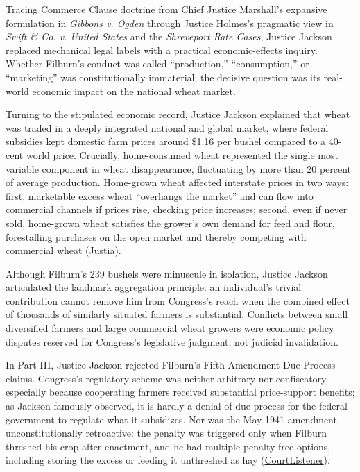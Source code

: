\documentclass[12pt]{article}
\begin{document}
Tracing Commerce Clause doctrine from Chief Justice Marshall's expansive formulation in \textit{Gibbons v. Ogden} through Justice Holmes's pragmatic view in \textit{Swift \& Co. v. United States} and the \textit{Shreveport Rate Cases}, Justice Jackson replaced mechanical legal labels with a practical economic-effects inquiry. Whether Filburn's conduct was called ``production,'' ``consumption,'' or ``marketing'' was constitutionally immaterial; the decisive question was its real-world economic impact on the national wheat market.

Turning to the stipulated economic record, Justice Jackson explained that wheat was traded in a deeply integrated national and global market, where federal subsidies kept domestic farm prices around \$1.16 per bushel compared to a 40-cent world price. Crucially, home-consumed wheat represented the single most variable component in wheat disappearance, fluctuating by more than 20 percent of average production. Home-grown wheat affected interstate prices in two ways: first, marketable excess wheat ``overhangs the market'' and can flow into commercial channels if prices rise, checking price increases; second, even if never sold, home-grown wheat satisfies the grower's own demand for feed and flour, forestalling purchases on the open market and thereby competing with commercial wheat (\href{https://supreme.justia.com/cases/federal/us/317/111/}{Justia}).

Although Filburn's 239 bushels were minuscule in isolation, Justice Jackson articulated the landmark aggregation principle: an individual's trivial contribution cannot remove him from Congress's reach when the combined effect of thousands of similarly situated farmers is substantial. Conflicts between small diversified farmers and large commercial wheat growers were economic policy disputes reserved for Congress's legislative judgment, not judicial invalidation.

In Part III, Justice Jackson rejected Filburn's Fifth Amendment Due Process claims. Congress's regulatory scheme was neither arbitrary nor confiscatory, especially because cooperating farmers received substantial price-support benefits; as Jackson famously observed, it is hardly a denial of due process for the federal government to regulate what it subsidizes. Nor was the May 1941 amendment unconstitutionally retroactive: the penalty was triggered only when Filburn threshed his crop after enactment, and he had multiple penalty-free options, including storing the excess or feeding it unthreshed as hay (\href{https://www.courtlistener.com/opinion/103716/wickard-v-filburn/}{CourtListener}).
\end{document}
